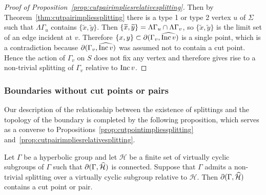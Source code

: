 \begin{proof}[Proof of Proposition~\ref{prop:cutpairimpliesrelativesplitting}]
Then by Theorem~\ref{thm:cutpairimpliessplitting} there is a type 1 or type 2
vertex $u$ of $\Sigma$ such that $\Lambda\Gamma_u$ contains $\{\widetilde{x},
\widetilde{y}\}$. Then $\{\widetilde{x}, \widetilde{y}\} = \Lambda\Gamma_u
\cap \Lambda\Gamma_v$, so $\{\widetilde{x}, \widetilde{y}\}$ is the
limit set of an edge incident at $v$. Therefore $\{x, y\} \subset
\partial(\Gamma_v, \widehat{\operatorname{\mathrm{Inc}} v})$ is a single point, which is a contradiction
because $\partial(\Gamma_v, \widehat{\operatorname{\mathrm{Inc}} v})$ was assumed not to contain a cut
point. Hence the action of $\Gamma_v$ on $S$ does not fix any vertex and
therefore gives rise to a non-trivial splitting of $\Gamma_v$ relative to $\operatorname{\mathrm{Inc}} v$.

\end{proof}

\subsubsection{Boundaries without cut points or pairs}

Our description of the relationship between the existence of splittings and the
topology of the boundary is completed by the following proposition, which serves as a
converse to Propositions~\ref{prop:cutpointimpliessplitting}
and~\ref{prop:cutpairimpliesrelativesplitting}.

\begin{prop}\label{prop:relativesplittingimpliescutpair} Let $\Gamma$ be a
  hyperbolic group and let $\mathcal{H}$ be a finite set of virtually cyclic
  subgroups of $\Gamma$ such that $\partial(\Gamma, \widehat{\mathcal{H}})$ is
    connected.  Suppose that $\Gamma$ admits a non-trivial splitting over a
  virtually cyclic subgroup relative to $\mathcal{H}$.  Then $\partial(\Gamma,
\widehat{\mathcal{H}})$ contains a cut point or pair.\end{prop}

